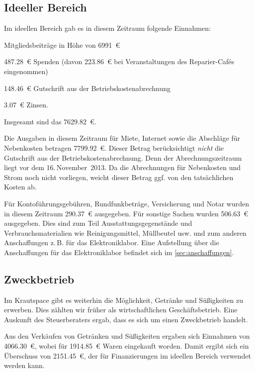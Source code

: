 \documentclass[ngerman]{scrartcl}
\begin{document}
\subsection{Ideeller Bereich}
\label{sec:ideeller_bereich}

Im ideellen Bereich gab es in diesem Zeitraum folgende Einnahmen:
\begin{compactitem}
\item Mitgliedsbeiträge in Höhe von \num{6991}~\euro{}
\item \num{487,28}~\euro{} Spenden (davon \num{223,86}~\euro{} bei Veranstaltungen des Reparier-Cafés eingenommen)
\item \num{148,46}~\euro{} Gutschrift aus der Betriebskostenabrechnung 
\item \num{3,07}~\euro{} Zinsen.
\end{compactitem}
Insgesamt sind das \num{7629,82}~\euro{}.

Die Ausgaben in diesem Zeitraum für Miete, Internet sowie die Abschläge für Nebenkosten betragen \num{7799,92}~\euro{}.
Dieser Betrag berücksichtigt \emph{nicht} die Gutschrift aus der Betriebskostenabrechnung. Denn der Abrechnungszeitraum liegt vor dem 16.\,November~2013.
Da die Abrechnungen für Nebenkosten und Strom noch nicht vorliegen, weicht dieser Betrag ggf. von den tatsächlichen Kosten ab.

Für Kontoführungsgebühren, Rundfunkbeträge, Versicherung und Notar wurden in diesem Zeitraum \num{290,37}~\euro{} ausgegeben.
Für sonstige Sachen wurden \num{506,63}~\euro{} ausgegeben. Dies sind zum Teil Ausstattungsgegenstände und Verbrauchsmaterialien wie Reinigungsmittel, Müllbeutel usw. und zum anderen Anschaffungen z.\,B. für das Elektroniklabor. Eine Aufstellung über die Anschaffungen für das Elektroniklabor befindet sich im \autoref{sec:anschaffungen}.

\subsection{Zweckbetrieb}
\label{sec:Zweckbetrieb}
Im Krautspace gibt es weiterhin die Möglichkeit, Getränke und Süßigkeiten zu erwerben.
Dies zählten wir früher als wirtschaftlichen Geschäftsbetrieb. Eine Auskunft des Steuerberaters ergab, dass es sich um einen Zweckbetrieb handelt.

Aus den Verkäufen  von Getränken und Süßigkeiten ergaben sich Einnahmen von \num{4066,30}~\euro{}, wobei für \num{1914,85}~\euro{} Waren eingekauft worden.
Damit ergibt sich ein Überschuss von \num{2151,45}~\euro{}, der für Finanzierungen im ideellen Bereich verwendet werden kann.
\end{document}
